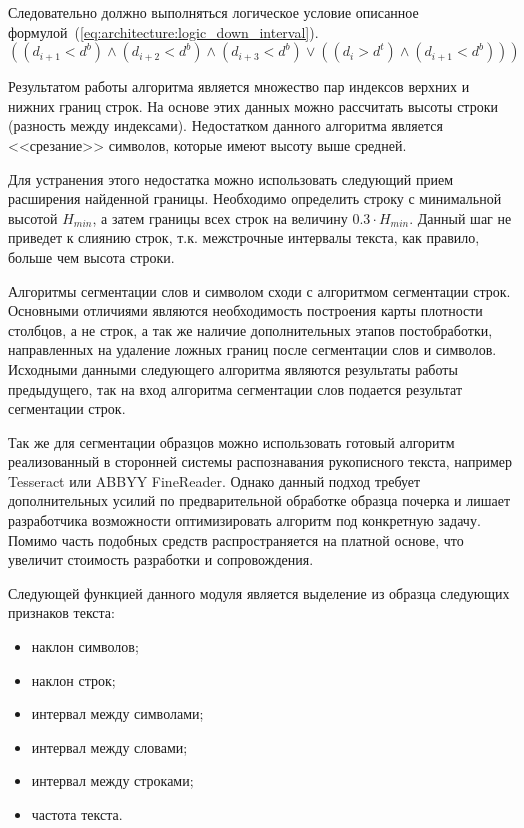 Следовательно должно выполняться логическое условие описанное формулой~(\ref{eq:architecture:logic_down_interval}).
\begin{equation}
  \label{eq:architecture:logic_down_interval}
  ((d_{i+1} < d^{b}) \wedge (d_{i+2} < d^{b}) \wedge (d_{i+3} < d^{b}) \vee ((d_i > d^{t}) \wedge (d_{i+1} < d^{b})))
\end{equation}

Результатом работы алгоритма является множество пар индексов верхних и нижних границ строк. На основе этих данных можно рассчитать высоты строки (разность между индексами). Недостатком данного алгоритма является <<срезание>> символов, которые имеют высоту выше средней.

Для устранения этого недостатка можно использовать следующий прием расширения найденной границы. Необходимо определить строку с минимальной высотой $ H_{min} $, а затем границы всех строк на величину $ 0.3 \cdot  H_{min} $. Данный шаг не приведет к слиянию строк, т.к. межстрочные интервалы текста, как правило, больше чем высота строки.
 
Алгоритмы сегментации слов и символом сходи с алгоритмом сегментации строк. Основными отличиями являются необходимость построения карты плотности столбцов, а не строк, а так же наличие дополнительных этапов постобработки, направленных на удаление ложных границ после сегментации слов и символов. Исходными данными следующего алгоритма являются результаты работы предыдущего, так на вход алгоритма сегментации слов подается результат сегментации строк.

Так же для сегментации образцов можно использовать готовый алгоритм реализованный в сторонней системы распознавания рукописного текста, например Tesseract или ABBYY FineReader. Однако данный подход требует дополнительных усилий по предварительной обработке образца почерка и лишает разработчика возможности оптимизировать алгоритм под конкретную задачу. Помимо часть подобных средств распространяется на платной основе, что увеличит стоимость разработки и сопровождения.

Следующей функцией данного модуля является выделение из образца следующих признаков текста:
\begin{itemize}
  \item наклон символов;
  \item наклон строк;
  \item интервал между символами;
  \item интервал между словами;
  \item интервал между строками;
  \item частота текста.
\end{itemize}

